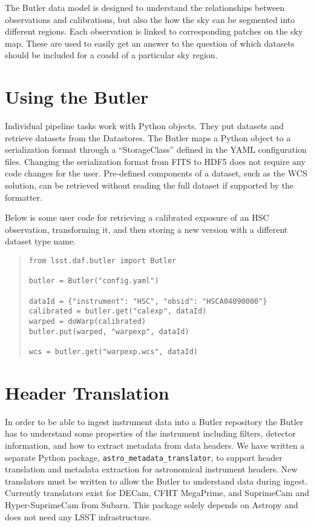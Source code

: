 \documentclass[11pt,twoside]{article}
\begin{document}
The Butler  data model is designed to understand the relationships between observations and calibrations, but also the how the sky can be segmented into different regions.
Each observation is linked to corresponding patches on the sky map.
These are used to easily get an answer to the question of which datasets should be included for a coadd of a particular sky region.

\section{Using the Butler}

Individual pipeline tasks  work with Python objects.
They put datasets and retrieve datasets from the Datastores.
The Butler maps a Python object  to  a serialization format through a ``StorageClass'' defined in the YAML configuration files.
Changing the serialization format from FITS to HDF5 does not require any code changes for the user.
Pre-defined components of a dataset, such as the WCS solution, can be retrieved without reading the full dataset if supported by the formatter.

Below is some user code for retrieving a calibrated exposure of an HSC observation, transforming it, and then storing a new version with a different dataset type name.

\begin{quote}
\begin{small}
\begin{verbatim}
from lsst.daf.butler import Butler

butler = Butler("config.yaml")

dataId = {"instrument": "HSC", "obsid": "HSCA04090000"}
calibrated = butler.get("calexp", dataId)
warped = doWarp(calibrated)
butler.put(warped, "warpexp", dataId)

wcs = butler.get("warpexp.wcs", dataId)
\end{verbatim}
\end{small}
\end{quote}

\section{Header Translation}

In order to be able to ingest instrument data into a Butler repository the Butler has to understand some properties of the instrument including filters, detector information, and how to extract metadata from data headers.
We have written a separate Python package, \texttt{astro\_metadata\_translator}, to support header translation and metadata extraction  for astronomical instrument headers.
New translators must be written to allow the Butler to understand data during ingest.
Currently translators exist for DECam, CFHT MegaPrime, and SuprimeCam and Hyper-SuprimeCam from Subaru.
This package solely depends on Astropy and does not need any LSST infrastructure.
\end{document}
